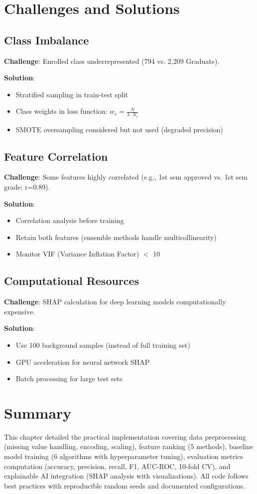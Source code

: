 \section{Challenges and Solutions}

\subsection{Class Imbalance}

\textbf{Challenge}: Enrolled class underrepresented (794 vs. 2,209 Graduate).

\textbf{Solution}: 
\begin{itemize}
\item Stratified sampling in train-test split
\item Class weights in loss function: $w_c = \frac{N}{3 \cdot N_c}$
\item SMOTE oversampling considered but not used (degraded precision)
\end{itemize}

\subsection{Feature Correlation}

\textbf{Challenge}: Some features highly correlated (e.g., 1st sem approved vs. 1st sem grade: r=0.89).

\textbf{Solution}:
\begin{itemize}
\item Correlation analysis before training
\item Retain both features (ensemble methods handle multicollinearity)
\item Monitor VIF (Variance Inflation Factor) $<$ 10
\end{itemize}

\subsection{Computational Resources}

\textbf{Challenge}: SHAP calculation for deep learning models computationally expensive.

\textbf{Solution}:
\begin{itemize}
\item Use 100 background samples (instead of full training set)
\item GPU acceleration for neural network SHAP
\item Batch processing for large test sets
\end{itemize}

\section{Summary}

This chapter detailed the practical implementation covering data preprocessing (missing value handling, encoding, scaling), feature ranking (5 methods), baseline model training (6 algorithms with hyperparameter tuning), evaluation metrics computation (accuracy, precision, recall, F1, AUC-ROC, 10-fold CV), and explainable AI integration (SHAP analysis with visualizations). All code follows best practices with reproducible random seeds and documented configurations.
